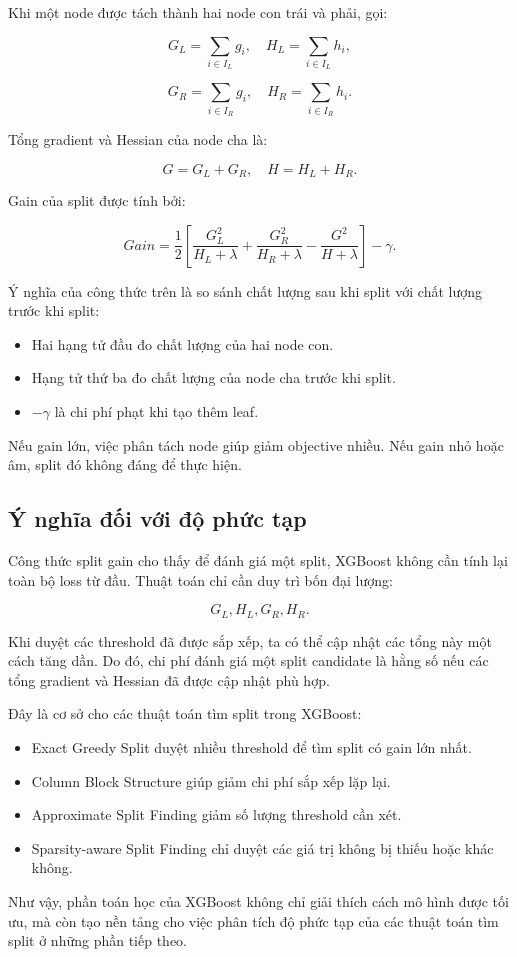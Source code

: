 Khi một node được tách thành hai node con trái và phải, gọi:

\[
G_L = \sum_{i \in I_L} g_i,
\quad
H_L = \sum_{i \in I_L} h_i,
\]

\[
G_R = \sum_{i \in I_R} g_i,
\quad
H_R = \sum_{i \in I_R} h_i.
\]

Tổng gradient và Hessian của node cha là:

\[
G = G_L + G_R,
\quad
H = H_L + H_R.
\]

Gain của split được tính bởi:

\[
Gain =
\frac{1}{2}
\left[
\frac{G_L^2}{H_L+\lambda}
+
\frac{G_R^2}{H_R+\lambda}
-
\frac{G^2}{H+\lambda}
\right]
-
\gamma.
\]

Ý nghĩa của công thức trên là so sánh chất lượng sau khi split với chất lượng trước khi split:

\begin{itemize}
    \item Hai hạng tử đầu đo chất lượng của hai node con.
    \item Hạng tử thứ ba đo chất lượng của node cha trước khi split.
    \item $-\gamma$ là chi phí phạt khi tạo thêm leaf.
\end{itemize}

Nếu gain lớn, việc phân tách node giúp giảm objective nhiều. Nếu gain nhỏ hoặc âm, split đó không đáng để thực hiện.

\subsection{Ý nghĩa đối với độ phức tạp}

Công thức split gain cho thấy để đánh giá một split, XGBoost không cần tính lại toàn bộ loss từ đầu. Thuật toán chỉ cần duy trì bốn đại lượng:

\[
G_L, H_L, G_R, H_R.
\]

Khi duyệt các threshold đã được sắp xếp, ta có thể cập nhật các tổng này một cách tăng dần. Do đó, chi phí đánh giá một split candidate là hằng số nếu các tổng gradient và Hessian đã được cập nhật phù hợp.

Đây là cơ sở cho các thuật toán tìm split trong XGBoost:

\begin{itemize}
    \item Exact Greedy Split duyệt nhiều threshold để tìm split có gain lớn nhất.
    \item Column Block Structure giúp giảm chi phí sắp xếp lặp lại.
    \item Approximate Split Finding giảm số lượng threshold cần xét.
    \item Sparsity-aware Split Finding chỉ duyệt các giá trị không bị thiếu hoặc khác không.
\end{itemize}

Như vậy, phần toán học của XGBoost không chỉ giải thích cách mô hình được tối ưu, mà còn tạo nền tảng cho việc phân tích độ phức tạp của các thuật toán tìm split ở những phần tiếp theo.